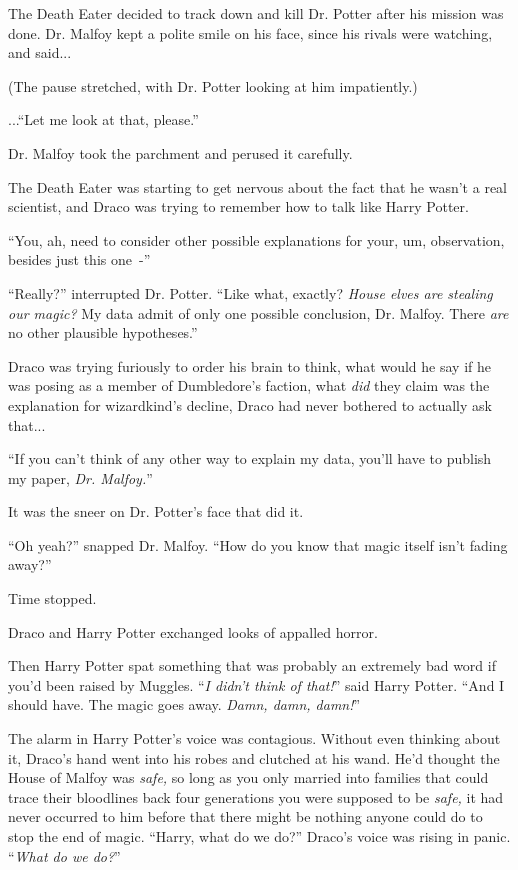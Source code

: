 The Death Eater decided to track down and kill Dr. Potter after his mission was done. Dr. Malfoy kept a polite smile on his face, since his rivals were watching, and said...

(The pause stretched, with Dr. Potter looking at him impatiently.)

...``Let me look at that, please.''

Dr. Malfoy took the parchment and perused it carefully.

The Death Eater was starting to get nervous about the fact that he wasn't a real scientist, and Draco was trying to remember how to talk like Harry Potter.

``You, ah, need to consider other possible explanations for your, um, observation, besides just this one~-''

``Really?'' interrupted Dr. Potter. ``Like what, exactly? \emph{House elves are stealing our magic?} My data admit of only one possible conclusion, Dr. Malfoy. There \emph{are} no other plausible hypotheses.''

Draco was trying furiously to order his brain to think, what would he say if he was posing as a member of Dumbledore's faction, what \emph{did} they claim was the explanation for wizardkind's decline, Draco had never bothered to actually ask that...

``If you can't think of any other way to explain my data, you'll have to publish my paper, \emph{Dr. Malfoy.}''

It was the sneer on Dr. Potter's face that did it.

``Oh yeah?'' snapped Dr. Malfoy. ``How do you know that magic itself isn't fading away?''

Time stopped.

Draco and Harry Potter exchanged looks of appalled horror.

Then Harry Potter spat something that was probably an extremely bad word if you'd been raised by Muggles. ``\emph{I didn't think of that!}'' said Harry Potter. ``And I should have. The magic goes away. \emph{Damn, damn, damn!}''

The alarm in Harry Potter's voice was contagious. Without even thinking about it, Draco's hand went into his robes and clutched at his wand. He'd thought the House of Malfoy was \emph{safe,} so long as you only married into families that could trace their bloodlines back four generations you were supposed to be \emph{safe,} it had never occurred to him before that there might be nothing anyone could do to stop the end of magic. ``Harry, what do we do?'' Draco's voice was rising in panic. ``\emph{What do we do?}''

